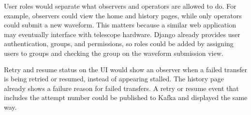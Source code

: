 \documentclass[12pt]{article}
\begin{document}
  User roles would separate what observers and operators are allowed to do. For example, observers could view the home and history pages, while only operators could submit a new waveform. This matters because a similar web application may eventually interface with telescope hardware. Django already provides user authentication, groups, and permissions, so roles could be added by assigning users to groups and checking the group on the waveform submission view.

  Retry and resume status on the UI would show an observer when a failed transfer is being retried or resumed, instead of appearing stalled. The history page already shows a failure reason for failed transfers. A retry or resume event that includes the attempt number could be published to Kafka and displayed the same way.


\end{document}
